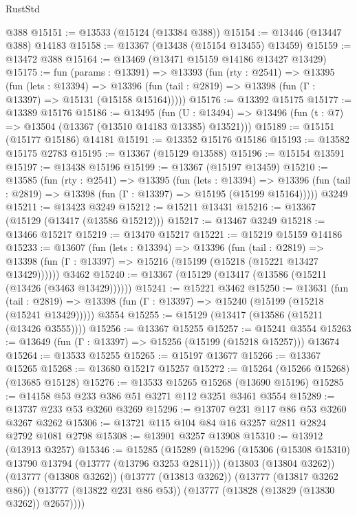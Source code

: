 \begin{lexlean}{RustStd}
\begin{coremodule}
    @388
@15151 := @13533 (@15124 (@13384 @388))
@15154 := @13446 (@13447 @388) @14183
@15158 := @13367 (@13438 (@15154 @13455) @13459)
@15159 := @13472 @388
@15164 := @13469 (@13471 @15159 @14186 @13427 @13429)
@15175 := fun (params : @13391) =>
  @13393
    (fun (rty : @2541) =>
    @13395
      (fun (lets : @13394) =>
      @13396 (fun (tail : @2819) => @13398 (fun (Γ : @13397) => @15131 (@15158 @15164)))))
@15176 := @13392 @15175
@15177 := @13389 @15176
@15186 := @13495
    (fun (U : @13494) => @13496 (fun (t : @7) => @13504 (@13367 (@13510 @14183 @13385) @13521)))
@15189 := @15151 (@15177 @15186) @14181
@15191 := @13352 @15176 @15186
@15193 := @13582 @15175 @2783
@15195 := @13367 (@15129 @13588)
@15196 := @15154 @13591
@15197 := @13438 @15196
@15199 := @13367 (@15197 @13459)
@15210 := @13585
    (fun (rty : @2541) =>
    @13395
      (fun (lets : @13394) =>
      @13396 (fun (tail : @2819) => @13398 (fun (Γ : @13397) => @15195 (@15199 @15164)))))
    @3249
@15211 := @13423 @3249
@15212 := @15211 @13431
@15216 := @13367 (@15129 (@13417 (@13586 @15212)))
@15217 := @13467 @3249
@15218 := @13466 @15217
@15219 := @13470 @15217
@15221 := @15219 @15159 @14186
@15233 := @13607
    (fun (lets : @13394) =>
    @13396
      (fun (tail : @2819) =>
      @13398 (fun (Γ : @13397) => @15216 (@15199 (@15218 (@15221 @13427 @13429))))))
    @3462
@15240 := @13367 (@15129 (@13417 (@13586 (@15211 (@13426 (@3463 @13429))))))
@15241 := @15221 @3462
@15250 := @13631
    (fun (tail : @2819) => @13398 (fun (Γ : @13397) => @15240 (@15199 (@15218 (@15241 @13429)))))
    @3554
@15255 := @15129 (@13417 (@13586 (@15211 (@13426 @3555))))
@15256 := @13367 @15255
@15257 := @15241 @3554
@15263 := @13649 (fun (Γ : @13397) => @15256 (@15199 (@15218 @15257))) @13674
@15264 := @13533 @15255
@15265 := @15197 @13677
@15266 := @13367 @15265
@15268 := @13680 @15217 @15257
@15272 := @15264 (@15266 @15268) (@13685 @15128)
@15276 := @13533 @15265 @15268 (@13690 @15196)
@15285 := @14158 @53 @233 @386 @51 @3271 @112 @3251 @3461 @3554
@15289 := @13737 @233 @53 @3260 @3269
@15296 := @13707 @231 @117 @86 @53 @3260 @3267 @3262
@15306 := @13721 @115 @104 @84 @16 @3257 @2811 @2824 @2792 @1081 @2798
@15308 := @13901 @3257 @13908
@15310 := @13912 (@13913 @3257)
@15346 := @15285
    (@15289
      (@15296
        (@15306 (@15308 @15310) @13790 @13794 (@13777 (@13796 @3253 @2811)))
        (@13803 (@13804 @3262))
        (@13777 (@13808 @3262))
        (@13777 (@13813 @3262))
        (@13777 (@13817 @3262 @86))
        (@13777 (@13822 @231 @86 @53))
        (@13777 (@13828 (@13829 (@13830 @3262)) @2657))))

\end{coremodule}
\end{lexlean}
